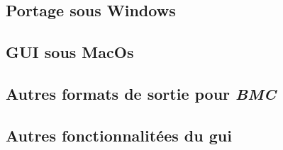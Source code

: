 
\subsection{Portage sous Windows}

\subsection{GUI sous MacOs}

\subsection{Autres formats de sortie pour \textit{BMC}}

\subsection{Autres fonctionnalitées du gui}

